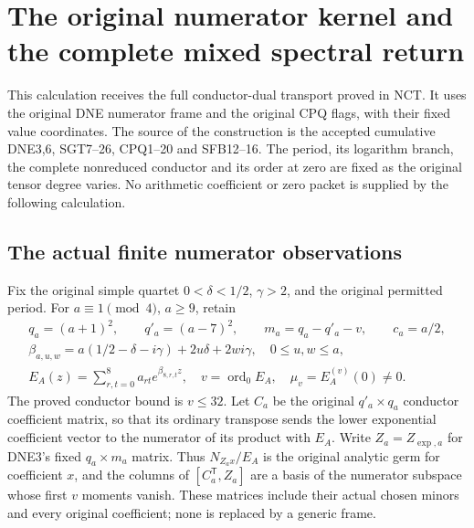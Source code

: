 \documentclass[11pt,a4paper]{article}
\begin{document}
\clearpage
\label{MTBUILD:NPK_COMPLETE_PREREQUISITE:start}
\clearpage
\label{MPBUILD:NUMERATOR_PROFILE_KERNEL:start}
\begingroup
\providecommand{\im}{\operatorname{im}}
\providecommand{\rank}{\operatorname{rank}}
\providecommand{\ord}{\operatorname{ord}}
\section{The original numerator kernel and the complete mixed spectral return}
\label{sec:NPK}

This calculation receives the full conductor-dual transport proved in
NCT. It uses the original DNE numerator frame and the original CPQ flags,
with their fixed value coordinates. The source of the construction is the
accepted cumulative DNE3,6, SGT7--26, CPQ1--20 and SFB12--16. The period,
its logarithm branch, the complete nonreduced conductor and its order at
zero are fixed as the original tensor degree varies. No arithmetic
coefficient or zero packet is supplied by the following calculation.

\subsection{The actual finite numerator observations}
Fix the original simple quartet
$0<\delta<1/2$, $\gamma>2$, and the original permitted period. For
$a\equiv1\pmod4$, $a\ge9$, retain
\[
 \begin{gathered}
 q_a=(a+1)^2,\qquad q'_a=(a-7)^2,\qquad
 m_a=q_a-q'_a-v,\qquad c_a=a/2,\\
 \beta_{a,u,w}=a(1/2-\delta-i\gamma)+2u\delta+2wi\gamma,
 \quad 0\le u,w\le a,\\
 E_A(z)=\sum_{r,t=0}^8a_{rt}e^{\beta_{8,r,t}z},\quad
 v=\ord_0E_A,\quad \mu_v=E_A^{(v)}(0)\ne0.
 \end{gathered}\tag{NPK1}
\]
The proved conductor bound is $v\le32$. Let $C_a$ be the original
$q'_a\times q_a$ conductor coefficient matrix, so that its ordinary
transpose sends the lower exponential coefficient vector to the numerator
of its product with $E_A$. Write $Z_a=Z_{\exp,a}$ for DNE3's fixed
$q_a\times m_a$ matrix. Thus $N_{Z_ax}/E_A$ is the original analytic
germ for coefficient $x$, and the columns of $[C_a^{\mathsf T},Z_a]$
are a basis of the numerator subspace whose first $v$ moments vanish.
These matrices include their actual chosen minors and every original
coefficient; none is replaced by a generic frame.
\end{document}
